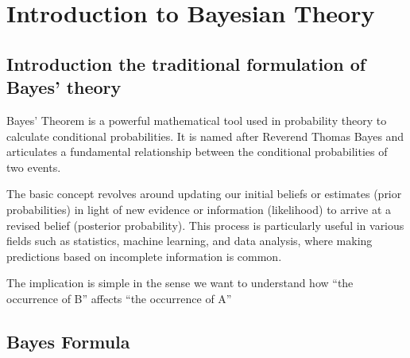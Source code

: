\documentclass[
  12 pt,
  a4paper,
]{book}
\numberwithin{equation}{section}
\theoremstyle{plain}      %
\theoremstyle{definition} %
\theoremstyle{remark}     %
\theoremstyle{note}         %
\begin{document}
\newpage

\hypertarget{introduction-to-bayesian-theory}{%
\section{Introduction to Bayesian
Theory}\label{introduction-to-bayesian-theory}}

\hypertarget{introduction-the-traditional-formulation-of-bayes-theory}{%
\subsection{Introduction the traditional formulation of Bayes'
theory}\label{introduction-the-traditional-formulation-of-bayes-theory}}

Bayes' Theorem is a powerful mathematical tool used in probability
theory to calculate conditional probabilities. It is named after
Reverend Thomas Bayes and articulates a fundamental relationship between
the conditional probabilities of two events.

The basic concept revolves around updating our initial beliefs or
estimates (prior probabilities) in light of new evidence or information
(likelihood) to arrive at a revised belief (posterior probability). This
process is particularly useful in various fields such as statistics,
machine learning, and data analysis, where making predictions based on
incomplete information is common.

The implication is simple in the sense we want to understand how ``the
occurrence of B'' affects ``the occurrence of A''

\begin{figure}[htbp]
\centering
{}
\label{fig:B_to_A}
\end{figure}

\newpage

\hypertarget{bayes-formula}{%
\subsection{Bayes Formula}\label{bayes-formula}}
\end{document}
